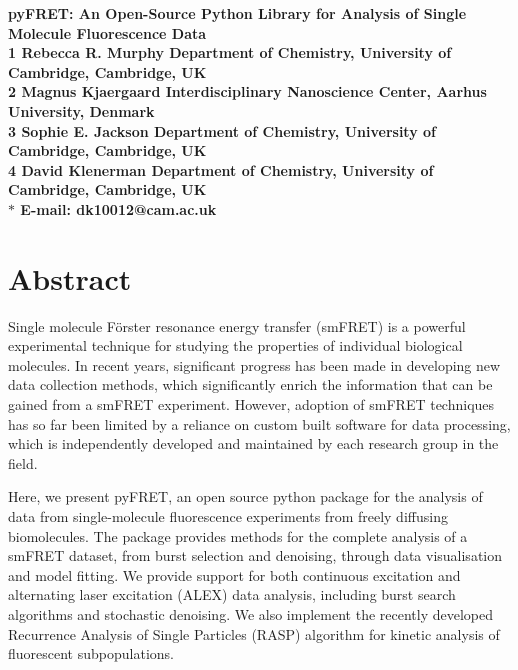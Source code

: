 \documentclass[10pt]{article}
\date{}
\begin{document}
\begin{flushleft}
{\Large
\textbf{pyFRET: An Open-Source Python Library for Analysis of Single Molecule Fluorescence Data}
}
\\
\bf{1} Rebecca R. Murphy Department of Chemistry, University of Cambridge, Cambridge, UK
\\
\bf{2} Magnus Kjaergaard Interdisciplinary Nanoscience Center, Aarhus University, Denmark 
\\
\bf{3} Sophie E. Jackson Department of Chemistry, University of Cambridge, Cambridge, UK
\\
\bf{4} David Klenerman Department of Chemistry, University of Cambridge, Cambridge, UK
\\
$\ast$ E-mail: dk10012@cam.ac.uk
\end{flushleft}

\section*{Abstract}


Single molecule  F\"{o}rster resonance energy transfer (smFRET) is a powerful experimental technique for studying the properties of individual biological molecules. In recent years, significant progress has been made in developing new data collection methods, which significantly enrich the information that can be gained from a smFRET experiment. However, adoption of smFRET techniques has so far been limited by a reliance on custom built software for data processing, which is independently developed and maintained by each research group in the field. 

Here, we present pyFRET, an open source python package for the analysis of data from single-molecule fluorescence experiments from freely diffusing biomolecules. The package provides methods for the complete analysis of a smFRET dataset, from burst selection and denoising, through data visualisation and model fitting. We provide support for both continuous excitation and alternating laser excitation (ALEX) data analysis, including burst search algorithms and stochastic denoising. We also implement the recently developed Recurrence Analysis of Single Particles (RASP) algorithm for kinetic analysis of fluorescent subpopulations.
\end{document}
